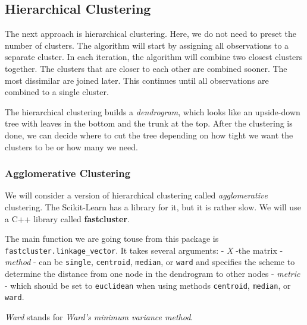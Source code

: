 \documentclass[11pt]{article}
\begin{document}
\subsection{Hierarchical Clustering}\label{hierarchical-clustering}

The next approach is hierarchical clustering. Here, we do not need to
preset the number of clusters. The algorithm will start by assigning all
observations to a separate cluster. In each iteration, the algorithm
will combine two closest clusters together. The clusters that are closer
to each other are combined sooner. The most dissimilar are joined later.
This continues until all observations are combined to a single cluster.

The hierarchical clustering builds a \emph{dendrogram}, which looks like
an upside-down tree with leaves in the bottom and the trunk at the top.
After the clustering is done, we can decide where to cut the tree
depending on how tight we want the clusters to be or how many we need.

\subsubsection{Agglomerative Clustering}\label{agglomerative-clustering}

We will consider a version of hierarchical clustering called
\emph{agglomerative} clustering. The Scikit-Learn has a library for it,
but it is rather slow. We will use a C++ library called
\textbf{fastcluster}.

The main function we are going touse from this package is
\texttt{fastcluster.linkage\_vector}. It takes several arguments: -
\emph{X} -the matrix - \emph{method} - can be \texttt{single},
\texttt{centroid}, \texttt{median}, or \texttt{ward} and specifies the
scheme to determine the distance from one node in the dendrogram to
other nodes - \emph{metric} - which should be set to \texttt{euclidean}
when using methods \texttt{centroid}, \texttt{median}, or \texttt{ward}.

\emph{Ward} stands for \emph{Ward's minimum variance method}.
\end{document}

